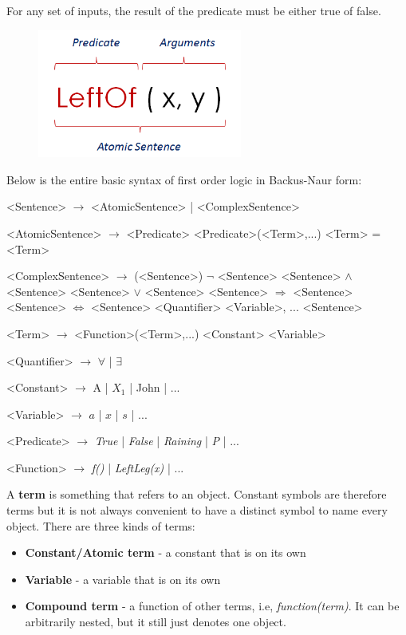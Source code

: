 \documentclass{article}
\begin{document}
For any set of inputs, the result of the predicate must be either true of false.
\begin{figure}[H]
\centering
\includegraphics[width=0.6\textwidth, keepaspectratio]{imgs/predicate.png}
\end{figure}
\noindent
Below is the entire basic syntax of first order logic in Backus-Naur form:
\begin{grammar}
<Sentence> $\rightarrow$ <AtomicSentence> | <ComplexSentence>

<AtomicSentence> $\rightarrow$ <Predicate>
\alt <Predicate>(<Term>,...)
\alt <Term> = <Term>

<ComplexSentence> $\rightarrow$ (<Sentence>)
\alt [<Sentence>]
\alt $\neg$ <Sentence>
\alt <Sentence> $\wedge$ <Sentence>
\alt <Sentence> $\vee$ <Sentence>
\alt <Sentence> $\Rightarrow$ <Sentence>
\alt <Sentence> $\Leftrightarrow$ <Sentence>
\alt <Quantifier> <Variable>, ... <Sentence>

<Term> $\rightarrow$ <Function>(<Term>,...)
\alt <Constant>
\alt <Variable>

<Quantifier> $\rightarrow$ $\forall$ | $\exists$

<Constant> $\rightarrow$ A | $X_{1}$ | John | ...

<Variable> $\rightarrow$ $a$ | $x$ | $s$ | ...

<Predicate> $\rightarrow$ \textit{True} | \textit{False} | \textit{Raining} | \textit{P} | ...

<Function> $\rightarrow$ \textit{f()} | \textit{LeftLeg(x)} | ...
\end{grammar}
A \textbf{term} is something that refers to an object. Constant symbols are therefore terms but it is not always convenient to have a distinct symbol to name every object. There are three kinds of terms:
\begin{itemize}
\item \textbf{Constant/Atomic term} - a constant that is on its own
\item \textbf{Variable} - a variable that is on its own
\item \textbf{Compound term} - a function of other terms, i.e, \textit{function(term)}. It can be arbitrarily nested, but it still just denotes one object.
\end{itemize}
\end{document}
